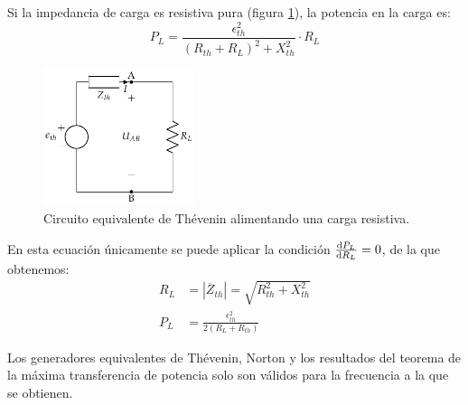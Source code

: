Si la impedancia de carga es resistiva pura (figura \ref{fig:thevenin-resistencia}), la potencia en la carga es:
\begin{equation}
  P_L = \frac{\epsilon^2_{th}}{(R_{th} + R_L)^2 + X_{th}^2} \cdot R_L
\end{equation}

\begin{figure}[H]
  \centering
  \includegraphics[height=4cm]{../figs/EquivalenteThevenin_RL.pdf}
  \caption{Circuito equivalente de Thévenin alimentando una carga resistiva.}
  \label{fig:thevenin-resistencia}
\end{figure}

En esta ecuación únicamente se puede aplicar la condición $\diff{P_L}{R_L} = 0$, de la que obtenemos:
\begin{align*}
      R_L &= |\overline{Z}_{th}| = \sqrt{R_{th}^2 + X_{th}^2}\\
      P_L &= \frac{\epsilon^2_{th}}{2(R_L + R_{th})}
\end{align*}

\begin{remark}
  Los generadores equivalentes de Thévenin, Norton y los resultados
  del teorema de la máxima transferencia de potencia solo son válidos
  para la frecuencia a la que se obtienen.
\end{remark}

